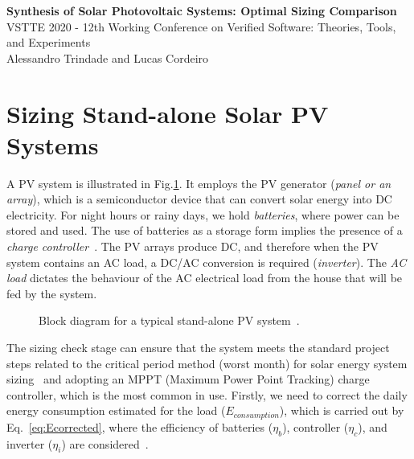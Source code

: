 \documentclass[12pt,a4paper]{article}
\begin{document}
\begin{center}
\textbf{Synthesis of Solar Photovoltaic Systems: Optimal Sizing Comparison} \\

VSTTE 2020 - 12th Working Conference on Verified Software: Theories, Tools, and Experiments\\

Alessandro Trindade and Lucas Cordeiro \\
\end{center}



\section{Sizing Stand-alone Solar PV Systems}
\label{sec:sizing}

A PV system is illustrated in Fig.\ref{fig:blockdiagram}. It employs the PV generator (\textit{panel or an array}), which is a semiconductor device that can convert solar energy into DC electricity. For night hours or rainy days, we hold \textit{batteries}, where power can be stored and used. The use of batteries as a storage form implies the presence of a \textit{charge controller}~\cite{Hansen}. The PV arrays produce DC, and therefore when the PV system contains an AC load, a DC/AC conversion is required (\textit{inverter}). The \textit{AC load} dictates the behaviour of the AC electrical load from the house that will be fed by the system.

\begin{figure}[h]
\centering
\caption{Block diagram for a typical stand-alone PV system~\cite{Hansen}.}
\label{fig:blockdiagram} 
\end{figure}

The sizing check stage can ensure that the system meets the standard project steps related to the critical period method (worst month) for solar energy system sizing~\cite{Pinho} and adopting an MPPT (Maximum Power Point Tracking) charge controller, which is the most common in use. Firstly, we need to correct the daily energy consumption estimated for the load ($E_{consumption}$), which is carried out by Eq.~\eqref{eq:Ecorrected}, where the efficiency of batteries ($\eta_{b}$), controller ($\eta_{c}$), and inverter ($\eta_{i}$) are considered~\cite{Pinho}.
\end{document}
